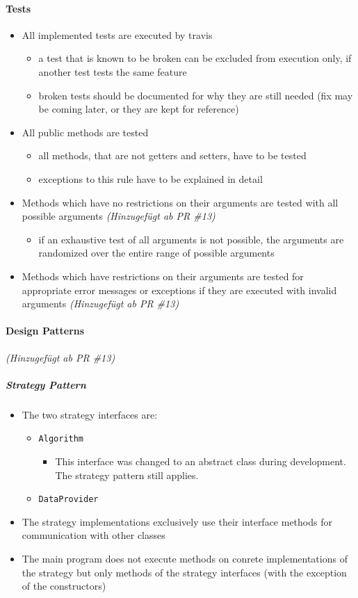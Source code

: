 \documentclass[accentcolor=tud0b,12pt,paper=a4]{tudreport}
\begin{document}
\paragraph{Tests}
\begin{itemize}
\item All implemented tests are executed by travis
	\begin{itemize}
	\item a test that is known to be broken can be excluded from execution only, if another test tests the same feature
	\item broken tests should be documented for why they are still needed (fix may be coming later, or they are kept for reference)
	\end{itemize}
\item All public methods are tested
	\begin{itemize}
	\item all methods, that are not getters and setters, have to be tested
	\item exceptions to this rule have to be explained in detail
	\end{itemize}
\item Methods which have no restrictions on their arguments are tested with all possible arguments \textit{(Hinzugefügt ab PR \#13)}
	\begin{itemize}
	\item if an exhaustive test of all arguments is not possible, the arguments are randomized over the entire range of possible arguments
	\end{itemize}
\item Methods which have restrictions on their arguments are tested for appropriate error messages or exceptions if they are executed with invalid arguments \textit{(Hinzugefügt ab PR \#13)}
\end{itemize}

\paragraph{Design Patterns} \textit{(Hinzugefügt ab PR \#13)}
\subparagraph{Strategy Pattern}
\begin{itemize}
\item The two strategy interfaces are:
	\begin{itemize}
	\item \texttt{Algorithm}
		\begin{itemize}
		\item This interface was changed to an abstract class during development. The strategy pattern still applies.
		\end{itemize}
	\item \texttt{DataProvider}
	\end{itemize}
\item The strategy implementations exclusively use their interface methods for communication with other classes
\item The main program does not execute methods on conrete implementations of the strategy but only methods of the strategy interfaces (with the exception of the constructors)
\end{itemize}
\end{document}
